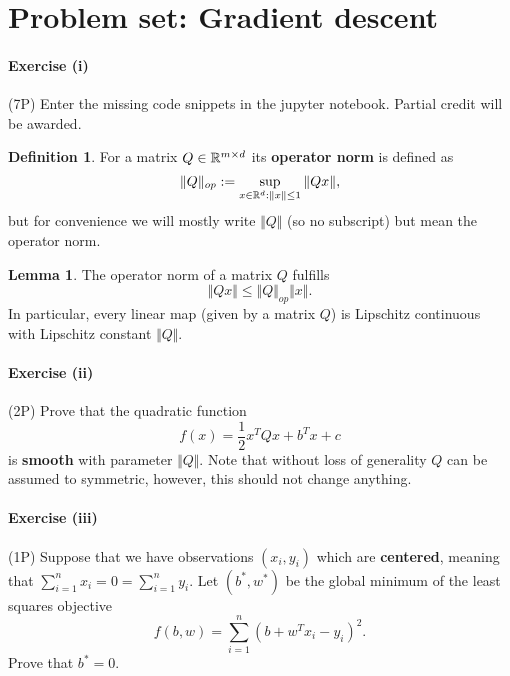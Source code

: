 \documentclass{scrartcl}
\theoremstyle{definition}
\newtheorem{definition}{Definition}[section]
\newtheorem{lemma}{Lemma}[section]
\begin{document}
\section*{Problem set: Gradient descent}%


\paragraph{Exercise (i)} (7P) Enter the missing code snippets in the jupyter notebook. Partial credit will be awarded.


\begin{definition}
  For a matrix $Q \in \mathbb{R}^{m \times d}$ its \textbf{operator norm} is defined as
  \begin{equation}
    \Vert Q \Vert_{op} := \sup_{x \in \mathbb{R}^d: \Vert x \Vert \le 1} \Vert Q x \Vert,
  \end{equation}
  but for convenience we will mostly write $\Vert Q \Vert$ (so no subscript) but mean the operator norm.
\end{definition}

\begin{lemma}%
  The operator norm of a matrix $Q$ fulfills
  \begin{equation}
    \Vert Qx \Vert \le \Vert Q \Vert_{op} \Vert x \Vert.
  \end{equation}
  In particular, every linear map (given by a matrix $Q$) is Lipschitz continuous with Lipschitz constant $\Vert Q \Vert$.
\end{lemma}


\paragraph{Exercise (ii)} (2P) Prove that the quadratic function
\begin{equation}
  f(x) = \frac{1}{2} x^T Q x +b^T x + c
\end{equation}
is \textbf{smooth} with parameter $\Vert Q \Vert$. Note that without loss of generality $Q$ can be assumed to symmetric, however, this should not change anything.


\paragraph{Exercise (iii)} (1P) Suppose that we have observations $(x_i, y_i)$ which are \textbf{centered}, meaning that $\sum_{i=1}^{n}x_i = 0 = \sum_{i=1}^{n}y_i$. Let $(b^*, w^*)$ be the global minimum of the least squares objective
\begin{equation}
  f(b, w) = \sum_{i=1}^{n} {(b + w^T x_i - y_i)}^2.
\end{equation}
Prove that $b^*=0$.
\end{document}
